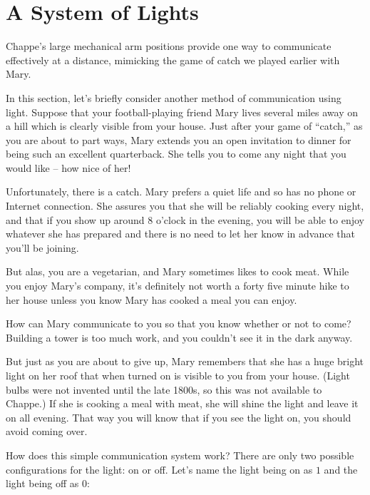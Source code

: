 \documentclass{book}
\begin{document}
\section{A System of Lights}

Chappe's large mechanical arm positions provide one way to communicate effectively at a distance, mimicking the game of catch we played earlier with Mary.

In this section, let's briefly consider another method of communication using light. Suppose that your football-playing friend Mary lives several miles away on a hill which is clearly visible from your house. Just after your game of ``catch,'' as you are about to part ways, Mary extends you an open invitation to dinner for being such an excellent quarterback. She tells you to come any night that you would like -- how nice of her!

Unfortunately, there is a catch. Mary prefers a quiet life and so has no phone or Internet connection. She assures you that she will be reliably cooking every night, and that if you show up around 8 o'clock in the evening, you will be able to enjoy whatever she has prepared and there is no need to let her know in advance that you'll be joining.

But alas, you are a vegetarian, and Mary sometimes likes to cook meat. While you enjoy Mary's company, it's definitely not worth a forty five minute hike to her house unless you know Mary has cooked a meal you can enjoy.

How can Mary communicate to you so that you know whether or not to come? Building a tower is too much work, and you couldn't see it in the dark anyway.

But just as you are about to give up, Mary remembers that she has a huge bright light on her roof that when turned on is visible to you from your house. (Light bulbs were not invented until the late 1800s, so this was not available to Chappe.) If she is cooking a meal with meat, she will shine the light and leave it on all evening. That way you will know that if you see the light on, you should avoid coming over.

How does this simple communication system work? There are only two possible configurations for the light: on or off. Let's name the light being on as $1$ and the light being off as $0$:
\end{document}
